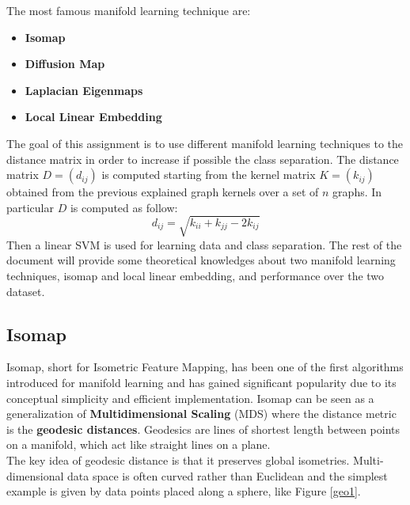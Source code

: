 \documentclass[11pt,a4paper]{article}
\begin{document}
The most famous manifold learning technique are:
\begin{itemize}
	\item \textbf{Isomap}
	\item \textbf{Diffusion Map}
	\item \textbf{Laplacian Eigenmaps}
	\item \textbf{Local Linear Embedding}
\end{itemize}
The goal of this assignment is to use different manifold learning techniques to the distance matrix in order to increase if possible the class separation. The distance matrix $D = (d_{ij})$ is computed starting from the kernel matrix $K = (k_{ij})$ obtained from the previous explained graph kernels over a set of $n$ graphs. In particular $D$ is computed as follow:
$$d_{ij} = \sqrt{k_{ii} + k_{jj} - 2k_{ij}}$$
Then a linear SVM is used for learning data and class separation. The rest of the document will provide some theoretical knowledges about two manifold learning techniques, isomap and local linear embedding, and performance over the two dataset.

\subsection{Isomap}
Isomap, short for Isometric Feature Mapping, has been one of the first algorithms introduced for manifold learning and has gained significant popularity due to its conceptual simplicity and efficient implementation. Isomap can be seen as a generalization of \textbf{Multidimensional Scaling} (MDS) where the distance metric is the \textbf{geodesic distances}. Geodesics are lines of shortest length between points on a manifold, which act like straight lines on a plane. \\
The key idea of geodesic distance is that it preserves global isometries. Multi-dimensional data space is often curved rather than Euclidean and the simplest example is given by data points placed along a sphere, like Figure \ref{geo1}. 
\end{document}
